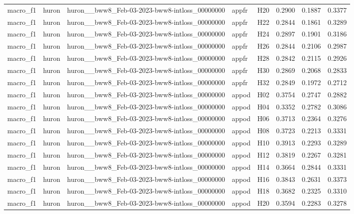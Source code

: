 \begin{table}[tbp]
\begin{tabular}{lllllrrr}
macro\_f1 & huron & huron\_\_bww8\_Feb-03-2023-bww8-intloss\_00000000 & appfr & H20 & 0.2900 & 0.1887 & 0.3377 \\
macro\_f1 & huron & huron\_\_bww8\_Feb-03-2023-bww8-intloss\_00000000 & appfr & H22 & 0.2844 & 0.1861 & 0.3289 \\
macro\_f1 & huron & huron\_\_bww8\_Feb-03-2023-bww8-intloss\_00000000 & appfr & H24 & 0.2897 & 0.1901 & 0.3186 \\
macro\_f1 & huron & huron\_\_bww8\_Feb-03-2023-bww8-intloss\_00000000 & appfr & H26 & 0.2844 & 0.2106 & 0.2987 \\
macro\_f1 & huron & huron\_\_bww8\_Feb-03-2023-bww8-intloss\_00000000 & appfr & H28 & 0.2842 & 0.2115 & 0.2926 \\
macro\_f1 & huron & huron\_\_bww8\_Feb-03-2023-bww8-intloss\_00000000 & appfr & H30 & 0.2869 & 0.2068 & 0.2833 \\
macro\_f1 & huron & huron\_\_bww8\_Feb-03-2023-bww8-intloss\_00000000 & appfr & H32 & 0.2849 & 0.1972 & 0.2712 \\
macro\_f1 & huron & huron\_\_bww8\_Feb-03-2023-bww8-intloss\_00000000 & appod & H02 & 0.3754 & 0.2747 & 0.2882 \\
macro\_f1 & huron & huron\_\_bww8\_Feb-03-2023-bww8-intloss\_00000000 & appod & H04 & 0.3352 & 0.2782 & 0.3086 \\
macro\_f1 & huron & huron\_\_bww8\_Feb-03-2023-bww8-intloss\_00000000 & appod & H06 & 0.3713 & 0.2364 & 0.3276 \\
macro\_f1 & huron & huron\_\_bww8\_Feb-03-2023-bww8-intloss\_00000000 & appod & H08 & 0.3723 & 0.2213 & 0.3331 \\
macro\_f1 & huron & huron\_\_bww8\_Feb-03-2023-bww8-intloss\_00000000 & appod & H10 & 0.3913 & 0.2293 & 0.3289 \\
macro\_f1 & huron & huron\_\_bww8\_Feb-03-2023-bww8-intloss\_00000000 & appod & H12 & 0.3819 & 0.2267 & 0.3281 \\
macro\_f1 & huron & huron\_\_bww8\_Feb-03-2023-bww8-intloss\_00000000 & appod & H14 & 0.3664 & 0.2844 & 0.3331 \\
macro\_f1 & huron & huron\_\_bww8\_Feb-03-2023-bww8-intloss\_00000000 & appod & H16 & 0.3843 & 0.2631 & 0.3373 \\
macro\_f1 & huron & huron\_\_bww8\_Feb-03-2023-bww8-intloss\_00000000 & appod & H18 & 0.3682 & 0.2325 & 0.3310 \\
macro\_f1 & huron & huron\_\_bww8\_Feb-03-2023-bww8-intloss\_00000000 & appod & H20 & 0.3594 & 0.2283 & 0.3278 \\

\end{tabular}
\end{table}
